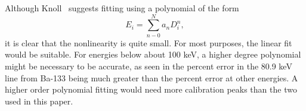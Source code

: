 Although Knoll~\cite{knoll2010radiation} suggests fitting using a polynomial of the form $$E_i = \sum_{n-0}^N a_n D_i^n,$$ it is clear that the nonlinearity is quite small. For most purposes, the linear fit would be suitable. For energies below about 100 keV, a higher degree polynomial might be necessary to be accurate, as seen in the percent error in the 80.9 keV line from Ba-133 being much greater than the percent error at other energies. A higher order polynomial fitting would need more calibration peaks than the two used in this paper.  
